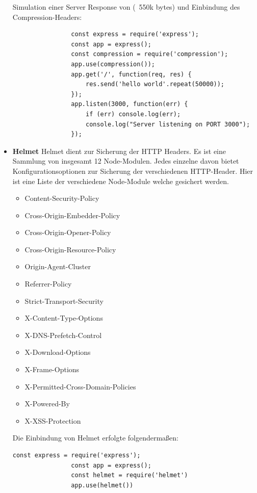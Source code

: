 \begin{itemize}
        Simulation einer Server Response von (~550k bytes) und Einbindung des Compression-Headers:
            \begin{lstlisting}
                const express = require('express');
                const app = express();
                const compression = require('compression');
                app.use(compression());
                app.get('/', function(req, res) {
                    res.send('hello world'.repeat(50000));
                });
                app.listen(3000, function(err) {
                    if (err) console.log(err);
                    console.log("Server listening on PORT 3000");
                });
            \end{lstlisting}
    \item \textbf{Helmet}
        \newline
        Helmet dient zur Sicherung der HTTP Headers. Es ist eine Sammlung von insgesamt 12 Node-Modulen. Jedes einzelne davon bietet Konfigurationsoptionen zur Sicherung der verschiedenen HTTP-Header. Hier ist eine Liste der verschiedene Node-Module welche gesichert werden.
        \begin{itemize}
            \item Content-Security-Policy
            \item Cross-Origin-Embedder-Policy
            \item Cross-Origin-Opener-Policy
            \item Cross-Origin-Resource-Policy
            \item Origin-Agent-Cluster
            \item Referrer-Policy
            \item Strict-Transport-Security
            \item X-Content-Type-Options
            \item X-DNS-Prefetch-Control
            \item X-Download-Options
            \item X-Frame-Options
            \item X-Permitted-Cross-Domain-Policies
            \item X-Powered-By
            \item X-XSS-Protection
        \end{itemize}

        Die Einbindung von Helmet erfolgte folgendermaßen:

            \begin{lstlisting}[caption=Verwendung von Helmet]
                const express = require('express');
                const app = express();
                const helmet = require('helmet')
                app.use(helmet())
            \end{lstlisting}


\end{itemize}
